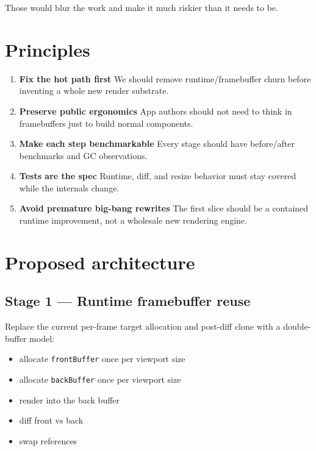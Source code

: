 Those would blur the work and make it much riskier than it needs to be.

\section{Principles}\label{record-052-principles}

\begin{enumerate}
\def\labelenumi{\arabic{enumi}.}
\item
  \textbf{Fix the hot path first} We should remove runtime/framebuffer churn before inventing a whole new render substrate.
\item
  \textbf{Preserve public ergonomics} App authors should not need to think in framebuffers just to build normal components.
\item
  \textbf{Make each step benchmarkable} Every stage should have before/after benchmarks and GC observations.
\item
  \textbf{Tests are the spec} Runtime, diff, and resize behavior must stay covered while the internals change.
\item
  \textbf{Avoid premature big-bang rewrites} The first slice should be a contained runtime improvement, not a wholesale new rendering engine.
\end{enumerate}

\section{Proposed architecture}\label{record-052-proposed-architecture}

\subsection{Stage 1 --- Runtime framebuffer reuse}\label{record-052-stage-1-runtime-framebuffer-reuse}

Replace the current per-frame target allocation and post-diff clone with a double-buffer model:

\begin{itemize}
\tightlist
\item
  allocate \texttt{f\allowbreak{}r\allowbreak{}o\allowbreak{}n\allowbreak{}t\allowbreak{}B\allowbreak{}u\allowbreak{}f\allowbreak{}f\allowbreak{}e\allowbreak{}r} once per viewport size
\item
  allocate \texttt{b\allowbreak{}a\allowbreak{}c\allowbreak{}k\allowbreak{}B\allowbreak{}u\allowbreak{}f\allowbreak{}f\allowbreak{}e\allowbreak{}r} once per viewport size
\item
  render into the back buffer
\item
  diff front vs back
\item
  swap references
\end{itemize}


